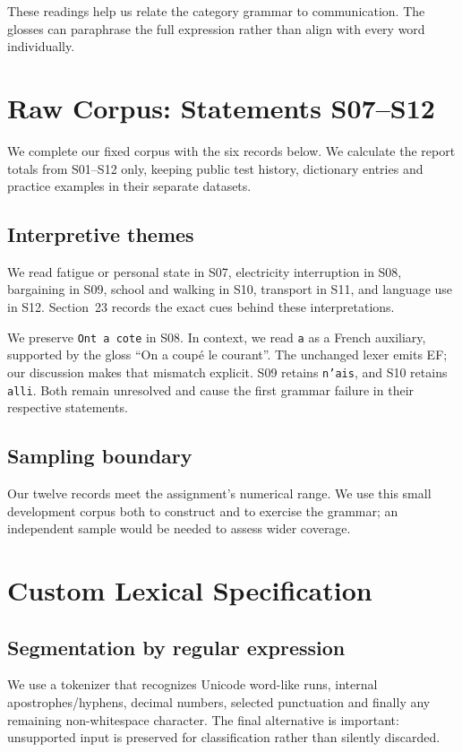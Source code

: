 \documentclass[11pt]{article}
\newcommand{\code}[1]{\texttt{#1}}
\begin{document}
These readings help us relate the category grammar to communication.
The glosses can paraphrase the full expression rather than align with
every word individually.

\clearpage
\section{Raw Corpus: Statements S07--S12}
We complete our fixed corpus with the six records below. We calculate the
report totals from S01--S12 only, keeping public test history, dictionary
entries and practice examples in their separate datasets.

{\small\renewcommand{\arraystretch}{1.6}}

\subsection*{Interpretive themes}
We read fatigue or personal state in S07, electricity interruption in S08,
bargaining in S09, school and walking in S10, transport in S11, and language
use in S12. Section~23 records the exact cues behind these interpretations.

We preserve \code{Ont a cote} in S08. In context, we read \code{a} as a
French auxiliary, supported by the gloss ``On a coup\'e le courant''.
The unchanged lexer emits EF; our discussion makes that mismatch explicit.
S09 retains \code{n'ais}, and S10 retains \code{alli}. Both remain unresolved
and cause the first grammar failure in their respective statements.

\subsection*{Sampling boundary}
Our twelve records meet the assignment's numerical range. We use this small
development corpus both to construct and to exercise the grammar; an
independent sample would be needed to assess wider coverage.

\clearpage
\section{Custom Lexical Specification}
\subsection*{Segmentation by regular expression}
We use a tokenizer that recognizes Unicode word-like runs, internal apostrophes/hyphens,
decimal numbers, selected punctuation and finally any remaining non-whitespace
character. The final alternative is important: unsupported input is preserved
for classification rather than silently discarded.
\end{document}
